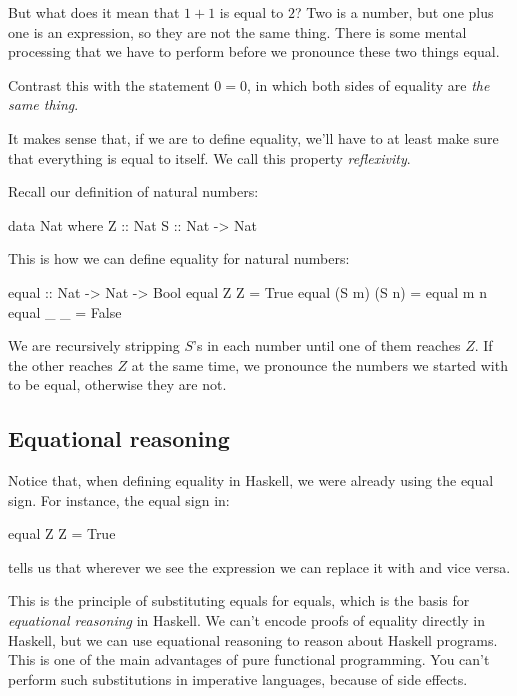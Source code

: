 \documentclass[DaoFP]{subfiles}
\begin{document}
But what does it mean that $1+1$ is equal to $2$? Two is a number, but one plus one is an expression, so they are not the same thing. There is some mental processing that we have to perform before we pronounce these two things equal. 

Contrast this with the statement $0 = 0$, in which both sides of equality are \emph{the same thing}. 

It makes sense that, if we are to define equality, we'll have to at least make sure that everything is equal to itself. We call this property \emph{reflexivity}. 

Recall our definition of natural numbers:
\begin{haskell}
data Nat where
  Z :: Nat
  S :: Nat -> Nat
\end{haskell}

This is how we can define equality for natural numbers:
\begin{haskell}
equal :: Nat -> Nat -> Bool
equal Z Z = True
equal (S m) (S n) = equal m n
equal _ _ = False
\end{haskell}
We are recursively stripping $S$'s in each number until one of them reaches $Z$. If the other reaches $Z$ at the same time, we pronounce the numbers we started with to be equal, otherwise they are not. 

\subsection{Equational reasoning}

Notice that, when defining equality in Haskell, we were already using the equal sign. For instance, the equal sign in:
\begin{haskell}
equal Z Z = True
\end{haskell}
tells us that wherever we see the expression  we can replace it with  and vice versa. 

This is the principle of substituting equals for equals, which is the basis for \emph{equational reasoning} in Haskell. We can't encode proofs of equality directly in Haskell, but we can use equational reasoning to reason about Haskell programs. This is one of the main advantages of pure functional programming. You can't perform such substitutions in imperative languages, because of side effects.
\end{document}
